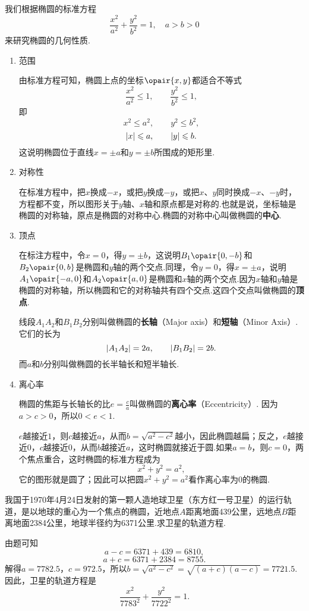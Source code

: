 我们根据椭圆的标准方程\[
\frac{x^2}{a^2} + \frac{y^2}{b^2} = 1,
\quad a > b > 0
\]来研究椭圆的几何性质.
\begin{enumerate}
\item 范围

由标准方程可知，椭圆上点的坐标\(\opair{x,y}\)都适合不等式\[
\frac{x^2}{a^2} \leqslant 1, \qquad \frac{y^2}{b^2} \leqslant 1,
\]即\[
x^2 \leqslant a^2, \qquad y^2 \leqslant b^2,
\]\[
\abs{x} \leqslant a, \qquad \abs{y} \leqslant b.
\]这说明椭圆位于直线\(x=\pm a\)和\(y=\pm b\)所围成的矩形里.

\item 对称性

在标准方程中，把\(x\)换成\(-x\)，或把\(y\)换成\(-y\)，或把\(x\)、\(y\)同时换成\(-x\)、\(-y\)时，方程都不变，所以图形关于\(y\)轴、\(x\)轴和原点都是对称的.也就是说，坐标轴是椭圆的对称轴，原点是椭圆的对称中心.椭圆的对称中心叫做椭圆的\textbf{中心}.

\item 顶点

在标注方程中，令\(x=0\)，得\(y=\pm b\)，这说明\(B_1\opair{0,-b}\)和\(B_2\opair{0,b}\)是椭圆和\(y\)轴的两个交点.同理，令\(y=0\)，得\(x=\pm a\)，说明\(A_1\opair{-a,0}\)和\(A_2\opair{a,0}\)是椭圆和\(x\)轴的两个交点.因为\(x\)轴和\(y\)轴是椭圆的对称轴，所以椭圆和它的对称轴共有四个交点.这四个交点叫做椭圆的\textbf{顶点}.

线段\(A_1 A_2\)和\(B_1 B_2\)分别叫做椭圆的\textbf{长轴}（Major axis）和\textbf{短轴}（Minor Axis）.它们的长为\[
\abs{A_1 A_2} = 2a, \qquad \abs{B_1 B_2} = 2b.
\]而\(a\)和\(b\)分别叫做椭圆的长半轴长和短半轴长.

\item 离心率

椭圆的焦距与长轴长的比\(e = \frac{c}{a}\)叫做椭圆的\textbf{离心率}（Eccentricity）.
因为\(a > c > 0\)，所以\(0 < e < 1\).

\(e\)越接近\(1\)，则\(c\)越接近\(a\)，从而\(b = \sqrt{a^2 - c^2}\)越小，因此椭圆越扁；反之，\(e\)越接近\(0\)，\(c\)越接近\(0\)，从而\(b\)越接近\(a\)，这时椭圆就接近于圆.如果\(a=b\)，则\(c=0\)，两个焦点重合，这时椭圆的标准方程成为\[
x^2 + y^2 = a^2,
\]它的图形就是圆了；因此可以把圆\(x^2+y^2=a^2\)看作离心率为\(0\)的椭圆.
\end{enumerate}

\begin{example}
我国于1970年4月24日发射的第一颗人造地球卫星（东方红一号卫星）的运行轨道，是以地球的重心为一个焦点的椭圆，近地点\(A\)距离地面439公里，远地点\(B\)距离地面2384公里，地球半径约为6371公里.求卫星的轨道方程.
\begin{solution}
由题可知\[
a - c = 6371 + 439 = 6810,
\]\[
a + c = 6371 + 2384 = 8755.
\]解得\(a=7782.5\)，\(c=972.5\)，所以\(b=\sqrt{a^2-c^2}=\sqrt{(a+c)(a-c)}=7721.5\).因此，卫星的轨道方程是\[
\frac{x^2}{7783^2}+\frac{y^2}{7722^2}=1.
\]
\end{solution}
\end{example}

